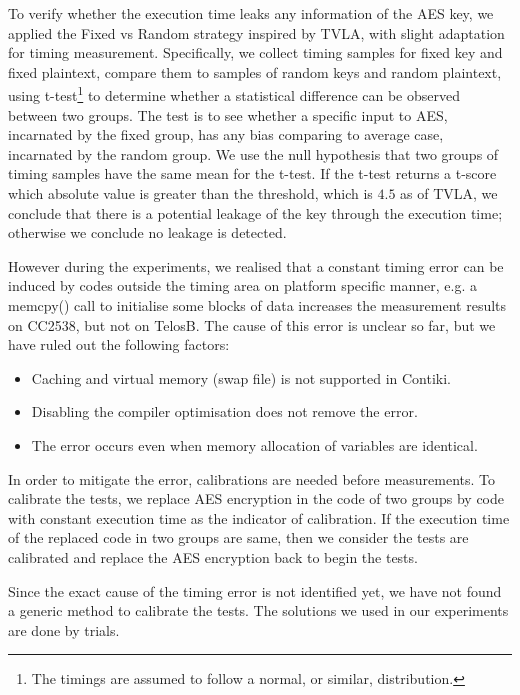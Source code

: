 To verify whether the execution time leaks any information of the AES key, we applied the Fixed vs Random strategy inspired by TVLA\cite{TVLA}, with slight adaptation for timing measurement. Specifically, we collect timing samples for fixed key and fixed plaintext, compare them to samples of random keys and random plaintext, using t-test\footnote{The timings are assumed to follow a normal, or similar, distribution.} to determine whether a statistical difference can be observed  between two groups. The test is to see whether a specific input to AES, incarnated by the fixed group, has any bias comparing to average case, incarnated by the random group. We use the null hypothesis that two groups of timing samples have the same mean for the t-test. If the t-test returns a t-score which absolute value is greater than the threshold, which is $4.5$ as of TVLA, we conclude that there is a potential leakage of the key through the execution time; otherwise we conclude no leakage is detected.

However during the experiments, we realised that a constant timing error can be induced by codes outside the timing area on platform specific manner, e.g. a memcpy() call to initialise some blocks of data increases the measurement results on CC2538, but not on TelosB. The cause of this error is unclear so far, but we have ruled out the following factors:

\begin{itemize}
	\item Caching and virtual memory (swap file) is not supported in Contiki.
	\item Disabling the compiler optimisation does not remove the error.
	\item The error occurs even when memory allocation of variables are identical.
\end{itemize}

In order to mitigate the error, calibrations are needed before measurements. To calibrate the tests, we replace AES encryption in the code of two groups by code with constant execution time as the indicator of calibration. If the execution time of the replaced code in two groups are same, then we consider the tests are calibrated and replace the AES encryption back to begin the tests.

Since the exact cause of the timing error is not identified yet, we have not found a generic method to calibrate the tests. The solutions we used in our experiments are done by trials.


